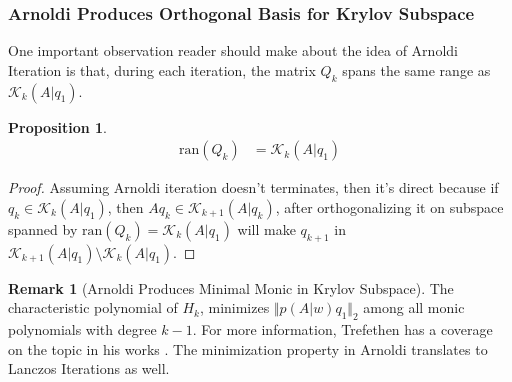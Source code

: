 \documentclass[]{article}
\theoremstyle{definition}
\newtheorem{prop}{Proposition}[section]  %
\newtheorem{remark}{Remark}[subsection]  %
\begin{document}
        \subsubsection{Arnoldi Produces Orthogonal Basis for Krylov Subspace}
            One important observation reader should make about the idea of Arnoldi Iteration is that, during each iteration, the matrix $Q_k$ spans the same range as $\mathcal K_k(A|q_1)$. 
            \begin{prop}
                \begin{align}
                    \text{ran}(Q_k) &= \mathcal K_k(A|q_1)
                \end{align}
            \end{prop}
            \begin{proof}
                Assuming Arnoldi iteration doesn't terminates, then it's direct because if $q_k\in \mathcal K_k(A|q_1)$, then $Aq_k\in \mathcal K_{k + 1}(A|q_k)$, after orthogonalizing it on subspace spanned by $\text{ran}(Q_{k}) = \mathcal K_k(A|q_1)$ will make $q_{k + 1}$ in $\mathcal K_{k + 1}(A|q_1)\setminus \mathcal K_k(A|q_1)$. 
            \end{proof}
            \begin{remark}[Arnoldi Produces Minimal Monic in Krylov Subspace]\label{remark:Arnoldi_Produces_Minimal_Monic_in_Krylov_Subspace}
                The characteristic polynomial of $H_k$, minimizes $\Vert p(A|w)q_1\Vert_2$ among all monic polynomials with degree $k - 1$. For more information, Trefethen has a coverage on the topic in his works \cite{book:trefethen}. The minimization property in Arnoldi translates to Lanczos Iterations as well. 
            \end{remark}
\end{document}
